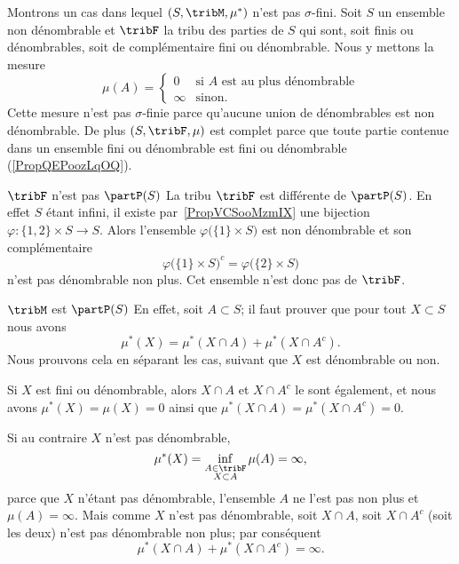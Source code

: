 \begin{example} \label{ExOIXoosScTC}
    Montrons un cas dans lequel \( (S,\tribM,\mu^*)\) n'est pas \( \sigma\)-fini. Soit \( S\) un ensemble non dénombrable et \( \tribF\) la tribu des parties de \( S\) qui sont, soit finis ou dénombrables, soit de complémentaire fini ou dénombrable. Nous y mettons la mesure
    \begin{equation}
        \mu(A)=\begin{cases}
            0       &   \text{si } A  \text{ est au plus dénombrable} \\
            \infty  &   \text{sinon}.
        \end{cases}
    \end{equation}
    Cette mesure n'est pas \( \sigma\)-finie parce qu'aucune union de dénombrables est non dénombrable. De plus \( (S,\tribF,\mu)\) est complet parce que toute partie contenue dans un ensemble fini ou dénombrable est fini ou dénombrable (\ref{PropQEPoozLqOQ}).

    \begin{subproof}
     \item[\( \tribF\) n'est pas \( \partP(S)\)]
        La tribu \( \tribF\) est différente de \( \partP(S)\). En effet \( S\) étant infini, il existe par~\ref{PropVCSooMzmIX} une bijection \( \varphi\colon \{ 1,2 \}\times S\to S\). Alors l'ensemble \( \varphi\big( \{ 1 \}\times S \big)\) est non dénombrable et son complémentaire
        \begin{equation}
            \varphi\big( \{ 1 \}\times S \big)^c=\varphi\big( \{ 2 \}\times S \big)
        \end{equation}
        n'est pas dénombrable non plus. Cet ensemble n'est donc pas de \( \tribF\).

    \item[\( \tribM\) est \( \partP(S)\)]
        En effet, soit \( A\subset S\); il faut prouver que pour tout \( X\subset S\) nous avons
        \begin{equation}
            \mu^*(X)=\mu^*(X\cap A)+\mu^*(X\cap A^c).
        \end{equation}
        Nous prouvons cela en séparant les cas, suivant que \( X\) est dénombrable ou non.

        Si \( X\) est fini ou dénombrable, alors \( X\cap A\) et \( X\cap A^c\) le sont également, et nous avons \( \mu^*(X)=\mu(X)=0\) ainsi que \( \mu^*(X\cap A)=\mu^*(X\cap A^c)=0\).

        Si au contraire \( X\) n'est pas dénombrable,
        \begin{equation}
            \mu^*(X)=\inf_{\substack{A\in\tribF\\X\subset A}}\mu(A)=\infty,
        \end{equation}
         parce que \( X\) n'étant pas dénombrable, l'ensemble \( A\) ne l'est pas non plus et \( \mu(A)=\infty\). Mais comme \( X\) n'est pas dénombrable, soit \( X\cap A\), soit \( X\cap A^c\) (soit les deux) n'est pas dénombrable non plus; par conséquent
         \begin{equation}
             \mu^*(X\cap A)+\mu^*(X\cap A^c)=\infty.
         \end{equation}
    \end{subproof}


\end{example}

